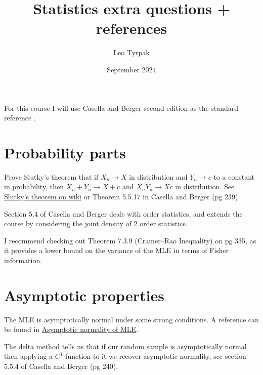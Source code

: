 \documentclass{article}
\title{Statistics extra questions + references}
\author{Leo Tyrpak}
\date{September 2024}
\begin{document}
\maketitle

For this course I will use Casella and Berger second edition as the standard reference \cite{CasellaBerger}.

\section{Probability parts}
Prove Slutky's theorem that if $X_n\rightarrow X$ in distribution and $Y_n\rightarrow c$ to a constant in probability, then $X_n+Y_n\rightarrow X+c$ and $X_nY_n\rightarrow Xc$ in distribution.
See \href{https://en.wikipedia.org/wiki/Slutsky%27s_theorem}{Slutky's theorem on wiki} or Theorem 5.5.17 in Casella and Berger (pg 239).

Section 5.4 of Casella and Berger deals with order statistics, and extends the course by considering the joint density of 2 order statistics.

I recommend checking out Theorem 7.3.9 (Cramer–Rao Inequality) on pg 335, as it provides a lower bound on the variance of the MLE in terms of Fisher information.
\section{Asymptotic properties}

The MLE is asymptotically normal under some strong conditions.
A reference can be found in \href{https://gregorygundersen.com/blog/2019/11/28/asymptotic-normality-mle/}{Asymptotic normality of MLE}.

The delta method tells us that if our random sample is asymptotically normal then applying a $C^1$ function to it we recover asymptotic normality, see section 5.5.4 of Casella and Berger (pg 240).



\end{document}
